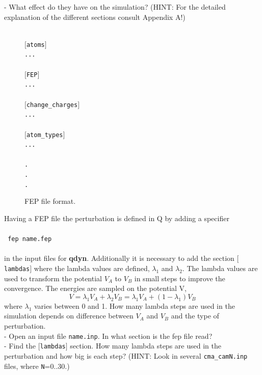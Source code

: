 \documentclass[10pt,oneside,pdftex]{article}
\begin{document}
- What effect do they have  on the simulation? (HINT: For the detailed
explanation of the different sections consult Appendix A!)\\


\begin{figure}[ht]
\texttt{
\\
$[$atoms$]$\\
...\\
\\
$[$FEP$]$\\
...\\
\\
$[$change\_charges$]$\\
...\\
\\
$[$atom\_types$]$\\
...\\
\\
.\\
.\\
.\\
}
\caption{\label{fig:fepfile}FEP file format.}
\end{figure}

Having a FEP file the perturbation is defined in Q by adding a
specifier
\\
\\
\texttt{ fep \hspace{2cm}    name.fep}
\\
\\
in the input files for \textbf{qdyn}. Additionally it is necessary to add
the section \texttt{$[$lambdas$]$} where the lambda values are
defined, $\lambda_1$ and $\lambda_2$. The lambda values are used
to transform the potential $V_A$ to $V_B$ in small steps to
improve the convergence. The energies are sampled on the potential
V,
\begin{equation}
\label{eq:lambda}
V=\lambda_1 V_A + \lambda_2 V_B = \lambda_1 V_A + (1-\lambda_1) V_B
\end{equation}
where $\lambda_1$ varies between 0 and 1. How many lambda steps
are used in the simulation depends on difference between
$V_A$ and $V_B$ and the type of perturbation.\\

- Open an input file \texttt{name.inp}. In what section is the fep file read?\\

- Find the \texttt{$[$lambdas$]$} section. How many lambda steps
are used in the perturbation and how big is each step? (HINT: Look
in several \texttt{cma\_camN.inp} files, where \texttt{N}=0..30.)\\
\end{document}
